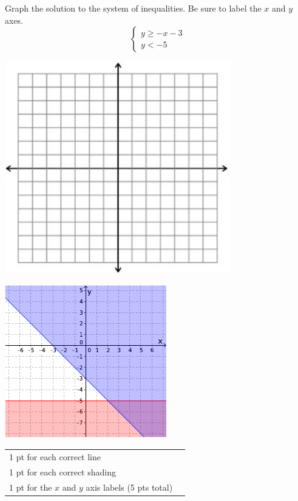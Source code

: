 {
	Graph the solution to the system of inequalities. Be sure to label the $x$ and $y$ axes. $$\begin{cases}y\geq -x-3 \\ y<-5 \end{cases}$$\begin{onlyproblem}\begin{center}\includegraphics{fig-graphpaper.png}\end{center}\end{onlyproblem} \begin{onlysolution}\begin{center}\includegraphics{fig095-12-5-a-answer}\end{center}\end{onlysolution}
	
}
{
	\begin{tabular}{l r}
	1 pt for each correct line\\
	1 pt for each correct shading\\
	1 pt for the $x$ and $y$ axis labels (5 pts total)\\
	\end{tabular}
}

